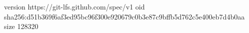 version https://git-lfs.github.com/spec/v1
oid sha256:d51b369f6af3ed95bc96f300e920679c0b3e87c9bffb5d762c5e400eb7d4b0aa
size 128320
